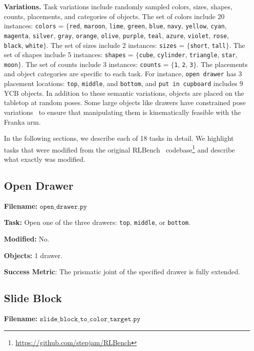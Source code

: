 \documentclass{article}
\begin{document}
\textbf{Variations.} Task variations include randomly sampled colors, sizes, shapes, counts, placements, and categories of objects. The set of colors include 20 instances: \texttt{colors} = $\{$\texttt{red}, \texttt{maroon}, \texttt{lime}, \texttt{green}, \texttt{blue}, \texttt{navy}, \texttt{yellow}, \texttt{cyan}, \texttt{magenta}, \texttt{silver}, \texttt{gray}, \texttt{orange}, \texttt{olive}, \texttt{purple}, \texttt{teal}, \texttt{azure}, \texttt{violet}, \texttt{rose}, \texttt{black}, \texttt{white}$\}$. The set of sizes include 2 instances: \texttt{sizes} = $\{$\texttt{short}, \texttt{tall}$\}$. The set of shapes include 5 instances: \texttt{shapes} = $\{$\texttt{cube}, \texttt{cylinder}, \texttt{triangle}, \texttt{star}, \texttt{moon}$\}$. The set of counts include 3 instances: \texttt{counts} = $\{$\texttt{1}, \texttt{2}, \texttt{3}$\}$. The placements and object categories are specific to each task. For instance, \texttt{open drawer} has 3 placement locations: \texttt{top}, \texttt{middle}, and \texttt{bottom}, and \texttt{put in cupboard} includes 9 YCB objects. In addition to these semantic variations, objects are placed on the tabletop at random poses. Some large objects like drawers have constrained pose variations~\citep{james2020rlbench} to ensure that manipulating them is kinematically feasible with the Franka arm.
 
In the following sections, we describe each of 18 tasks in detail. We highlight tasks that were modified from the original RLBench~\citep{james2020rlbench} codebase\footnote{\url{https://github.com/stepjam/RLBench}} and describe what exactly was modified.

\subsection{Open Drawer}
\textbf{Filename:} $\texttt{open\_drawer.py}$ 

\textbf{Task:} Open one of the three drawers: \texttt{top}, \texttt{middle}, or \texttt{bottom}.

\textbf{Modified:} No.

\textbf{Objects:} 1 drawer.

\textbf{Success Metric}: The prismatic joint of the specified drawer is fully extended. 

\subsection{Slide Block}
\textbf{Filename:} $\texttt{slide\_block\_to\_color\_target.py}$ 
\end{document}
